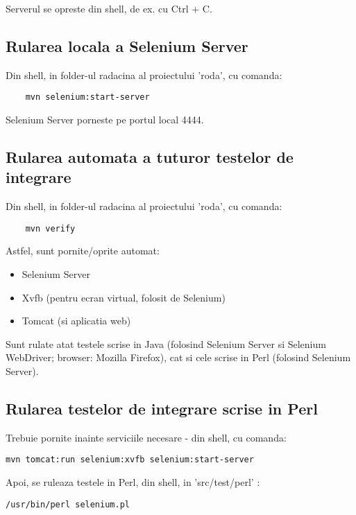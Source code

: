 Serverul se opreste din shell, de ex. cu Ctrl + C.

\subsection{Rularea locala a Selenium Server}
Din shell, in folder-ul radacina al proiectului 'roda', cu comanda:
\begin{lstlisting}
	mvn selenium:start-server
\end{lstlisting}
Selenium Server porneste pe portul local 4444.

\subsection{Rularea automata a tuturor testelor de integrare}
Din shell, in folder-ul radacina al proiectului 'roda', cu comanda:
\begin{lstlisting}
	mvn verify
\end{lstlisting}
Astfel, sunt pornite/oprite automat:
\begin{itemize}
\item
Selenium Server
\item
Xvfb (pentru ecran virtual, folosit de Selenium)
\item
Tomcat (si aplicatia web)
\end{itemize}


Sunt rulate atat testele scrise in Java 
(folosind Selenium Server si Selenium WebDriver; browser: Mozilla Firefox), 
cat si cele scrise in Perl (folosind Selenium Server).

\subsection{Rularea testelor de integrare scrise in Perl}
Trebuie pornite inainte serviciile necesare - din shell, cu comanda:
\begin{lstlisting}[breaklines=true]
	mvn tomcat:run selenium:xvfb selenium:start-server
\end{lstlisting}
Apoi, se ruleaza testele in Perl, din shell, in 'src/test/perl' :
\begin{lstlisting}[breaklines=true]
	/usr/bin/perl selenium.pl
\end{lstlisting}


\begin{comment}
\subsection{Rularea automata a testelor web (Selenium)}
Din shell, in folder-ul radacina al proiectului 'roda', cu comanda:
\begin{lstlisting}
	mvn tomcat:run selenium:selenese
\end{lstlisting}
\end{comment}


